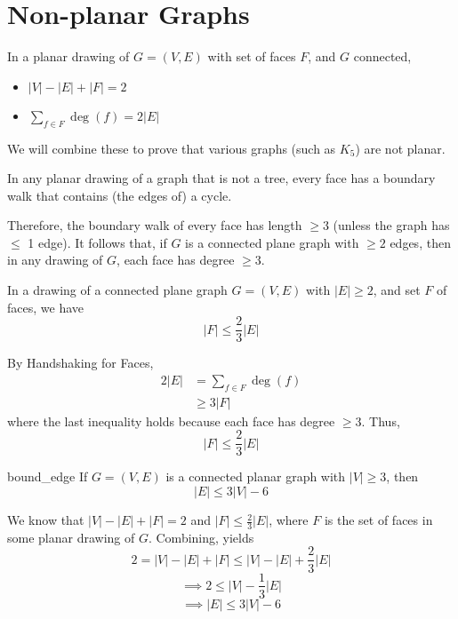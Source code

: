 \section{Non-planar Graphs}
In a planar drawing of $ G=(V,E) $ with set of faces $ F $,
and $ G $ connected,
\begin{itemize}
    \item $ |V|-|E|+|F|=2 $
    \item $ \sum\limits_{f\in F}\deg(f)=2|E| $
\end{itemize}
We will combine these to prove that various graphs
(such as $ K_5 $) are not planar.


\begin{Proposition}{}{}
    In any planar drawing of a graph that is not a tree,
    every face has a boundary walk that contains
    (the edges of) a cycle.
\end{Proposition}

Therefore, the boundary walk of every face has
length $ \geqslant 3 $ (unless the graph has $ \leqslant $ 1 edge).
It follows that, if $ G $ is a connected plane graph with $ \geqslant 2 $
edges, then in any drawing of $ G $, each face has degree $ \geqslant 3 $.


\begin{Proposition}{}{}
    In a drawing of a connected plane graph $ G=(V,E) $
    with $ |E|\geqslant 2 $, and set $ F $ of faces, we have
    \[ |F|\leqslant \frac{2}{3}|E| \]
\end{Proposition}

\begin{Proof}{}{}
    By Handshaking for Faces,
    \begin{align*}
        2|E|
         & =\sum\limits_{f\in F}\deg(f) \\
         & \geqslant 3|F|
    \end{align*}
    where the last inequality holds because each face has degree $ \geqslant 3 $.
    Thus,
    \[ |F|\leqslant \frac{2}{3}|E| \]
\end{Proof}


\begin{Lemma}{}{bound_edge}
    If $ G=(V,E) $ is a connected planar graph with $ |V|\geqslant 3 $,
    then
    \[ |E|\leqslant 3|V|-6 \]
\end{Lemma}

\begin{Proof}{}{}
    We know that $ |V|-|E|+|F|=2 $ and $ |F|\leqslant \frac{2}{3} |E| $,
    where $ F $ is the set of faces in some planar drawing of $ G $.
    Combining, yields
    \[ 2=|V|-|E|+|F|\leqslant |V|-|E|+\frac{2}{3}|E| \]
    \[ \implies 2\leqslant |V|-\frac{1}{3} |E| \]
    \[ \implies |E|\leqslant 3|V|-6 \]
\end{Proof}


